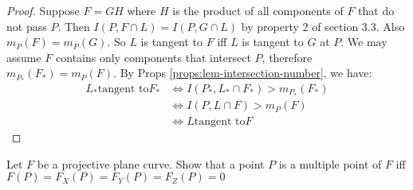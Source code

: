 \documentclass{solution}
\begin{document}
\begin{proof}
    Suppose $F = GH$ where $H$ is the product of all components of $F$ that do not pass $P$. Then $I(P, F \cap L) = I(P, G \cap L)$ by property 2 of section 3.3. Also $m_P(F) = m_P(G)$. So $L$ is tangent to $F$ iff $L$ is tangent to $G$ at $P$. We may assume $F$ contains only components that intersect $P$, therefore $m_{P_*}(F_*) = m_{P}(F)$. By Props \ref{props:lem-intersection-number}, we have:
    $$
        \begin{aligned}
        L_* \text{tangent to} F_* & \Leftrightarrow I(P_*, L_* \cap F_*) \gt m_{P_*}(F_*) \\
        &\Leftrightarrow I(P, L \cap F) \gt m_{P}(F) \\
        &\Leftrightarrow L \text{tangent to} F
        \end{aligned}
    $$
\end{proof}

\begin{problem}{5.1}
    Let $F$ be a projective plane curve. Show that a point $P$ is a multiple point of $F$ iff $F(P) = F_X(P) = F_Y(P) = F_Z(P) = 0$
\end{problem}
\end{document}
